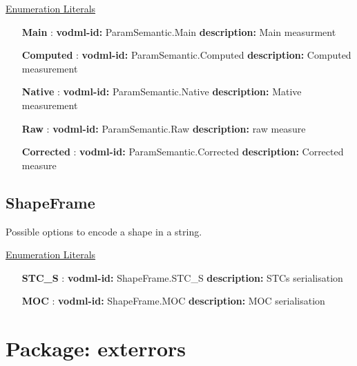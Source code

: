   \noindent \underline{Enumeration Literals}
  \vspace{-\parsep}
  \small
  \begin{itemize}
  
    \item[\textbf{Main}]: \textbf{vodml-id:} ParamSemantic.Main \newline
          \textbf{description:} Main measurment
    \item[\textbf{Computed}]: \textbf{vodml-id:} ParamSemantic.Computed \newline
          \textbf{description:} Computed measurement
    \item[\textbf{Native}]: \textbf{vodml-id:} ParamSemantic.Native \newline
          \textbf{description:} Mative measurement
    \item[\textbf{Raw}]: \textbf{vodml-id:} ParamSemantic.Raw \newline
          \textbf{description:} raw measure
    \item[\textbf{Corrected}]: \textbf{vodml-id:} ParamSemantic.Corrected \newline
          \textbf{description:} Corrected measure
  \end{itemize}
  \normalsize


  \subsection{ShapeFrame}
  \label{sect:ShapeFrame}

  Possible options to encode a shape in a string.

  \noindent \underline{Enumeration Literals}
  \vspace{-\parsep}
  \small
  \begin{itemize}
  
    \item[\textbf{STC\_S}]: \textbf{vodml-id:} ShapeFrame.STC\_S \newline
          \textbf{description:} STCs serialisation
    \item[\textbf{MOC}]: \textbf{vodml-id:} ShapeFrame.MOC \newline
          \textbf{description:} MOC serialisation
  \end{itemize}
  \normalsize


\pagebreak
\section{Package: exterrors }


